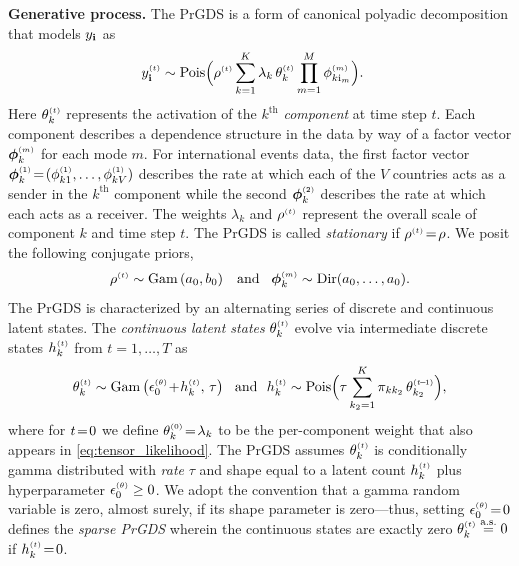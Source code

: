 \documentclass{article}
\begin{document}
\textbf{Generative process.} The PrGDS is a form of canonical polyadic decomposition \cite{harshman1970foundations} that models $y_{\textbf{\textrm{i}}}$ as~
\begin{align}
\label{eq:tensor_likelihood}
\ydt &\sim \textrm{Pois}\Big(\rhot \sum_{k = 1}^K \lambda_k \, \thetakt \prod_{m=1}^M \phi^{\mathsmaller{(m)}}_{k \osub_m}\Big).
\end{align}
Here $\thetakt$ represents the activation of the $k^{\textrm{th}}$ \emph{component} at time step $t$. Each component describes a dependence structure in the data by way of a factor vector $\boldsymbol{\phi}^{\mathsmaller{(m)}}_{k}$ for each mode $m$. For international events data, the first factor vector $\boldsymbol{\phi}^{\mathsmaller{(1)}}_{k} \teq (\phi^{\mathsmaller{(1)}}_{k1},\dots,\phi^{\mathsmaller{(1)}}_{kV})$ describes the rate at which each of the $V$ countries acts as a sender in the $k^{\textrm{th}}$ component while the second $\boldsymbol{\phi}^{\mathsmaller{(2)}}_{k}$ describes the rate at which each acts as a receiver. The weights $\lambda_k$ and $\rho^{\mathsmaller{(t)}}$ represent the overall scale of component $k$ and time step $t$. The PrGDS is called \emph{stationary} if $\rhot \teq \rho$. We posit the following conjugate priors,~
\begin{equation}
\rhot \sim \Gam{a_0, b_0} \,\,\,\textrm{ and }\,\,\, \boldsymbol{\phi}^{\mathsmaller{(m)}}_k \sim \textrm{Dir}(a_0,\dots,a_0).
\end{equation}
The PrGDS is characterized by an alternating series of discrete and continuous latent states. The \emph{continuous latent states} $\thetakt$ evolve via intermediate discrete states $\hkt$ from $t=1,\dots,T$ as~
\begin{equation}
\label{eq:thetaktandhkt}
\thetakt \sim \Gam{\epstheta \tp \hkt,\, \tau} \,\,\textrm{ and }\,\, \hkt \sim \textrm{Pois}\Big(\tau \sum_{k_2 = 1}^K \pi_{kk_2} \,\thetakttm\Big),
\end{equation}
where for $t\!=\! 0$ we define $\theta^{\mathsmaller{(0)}}_k \teq \lambda_k$ to be the per-component weight that also appears in \cref{eq:tensor_likelihood}. The PrGDS assumes $\thetakt$ is conditionally gamma distributed with \emph{rate} $\tau$ and shape equal to a latent count $\hkt$ plus hyperparameter $\epstheta \geq 0$. We adopt the convention that a gamma random variable is zero, almost surely, if its shape parameter is zero---thus, setting $\epstheta \teq 0$ defines the \emph{sparse PrGDS} wherein the continuous states are exactly zero $\thetakt \stackrel{\textrm{a.s.}}{=} 0$ if $\hkt \teq 0$.
\end{document}
